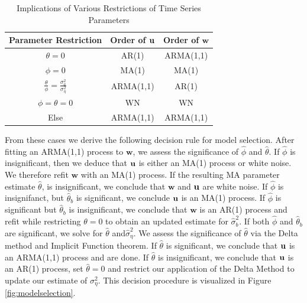 \begin{table}[htbp]
\centering
\begin{tabular}{|c|c|c|}
\hline
Parameter Restriction                                                   & Order of $\mathbf{u}$    & Order of $\mathbf{w}$ \\ \hline
$\theta = 0$                                                            & AR(1)             & ARMA(1,1)             \\ \hline
$\phi = 0$                                                              & MA(1)             & MA(1)                 \\ \hline
$\frac{\theta}{\phi} = \frac{\sigma_a^2}{\sigma_\eta^2}$                & ARMA(1,1)         & AR(1)                 \\ \hline
$\phi = \theta = 0$                                                     & WN                & WN                    \\ \hline
Else                                                                    & ARMA(1,1)         & ARMA(1,1)             \\ \hline
\end{tabular}
\caption{Implications of Various Restrictions of Time Series Parameters}
\label{tab:my_table}
\end{table}



From these cases we derive the following decision rule for model selection. After fitting 
an ARMA(1,1) process to $\mathbf{w}$, we assess the significance of $\hat{\phi}$ and $\hat{\theta}$.
If $\hat{\phi}$ is insignificant, then we deduce that $\mathbf{u}$ is either an MA(1) process or white noise.
We therefore refit $\mathbf{w}$ with an MA(1) process. If the resulting MA parameter estimate $\hat{\theta}$,
is insignificant, we conclude that $\mathbf{w}$ and $\mathbf{u}$ are white noise. If $\hat{\phi}$ is insignifanct,
but $\hat{\theta}_b$ is significant, we conclude $\mathbf{u}$ is an MA(1) process. If $\hat{\phi}$ is 
significant but $\hat{\theta}_b$ is insignificant, we conclude that $\mathbf{w}$ is an AR(1) process and
refit while restricting $\theta = 0$ to obtain an updated estimate for $\hat{\sigma}_b^2$. If both  
$\hat{\phi}$ and $\hat{\theta}_b$ are significant, we solve for $\hat{\theta}$ and$\hat{\sigma}_\eta^2$.
We assess the significance of $\hat{\theta}$ via the Delta method and Implicit Function theorem.
If $\hat{\theta}$ is significant, we conclude that $\mathbf{u}$ is an ARMA(1,1) process and are done.
If $\hat{\theta}$ is insignificant, we conclude that $\mathbf{u}$ is an AR(1) process, set $\hat{\theta} = 0$ and restrict
our application of the Delta Method to update our estimate of $\sigma_\eta^2$. This decision
procedure is visualized in Figure \ref{fig:modelselection}.



